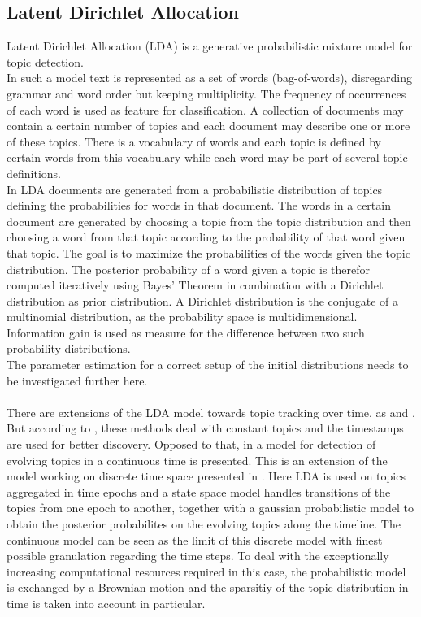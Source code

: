 \subsection{Latent Dirichlet Allocation}\label{sec:LDA}

Latent Dirichlet Allocation (LDA) \cite{Blei:2003:LDA:944919.944937}
 is a generative probabilistic mixture model for topic detection.
\\
In such a model text is represented as a set of words (bag-of-words), disregarding grammar and word order but keeping multiplicity. The frequency of occurrences of each word is used as feature for classification. A collection of documents may contain a certain number of topics and each document may describe one or more of these topics. There is a vocabulary of words and each topic is defined by certain words from this vocabulary while each word may be part of several topic definitions.
\\
In LDA documents are generated from a probabilistic distribution of topics defining the probabilities for words in that document. The words in a certain document are generated by choosing a topic from the topic distribution and then choosing a word from that topic according to the probability of that word given that topic. The goal is to maximize the probabilities of the words given the topic distribution.
The posterior probability of a word given a topic is therefor computed iteratively using Bayes' Theorem in combination with a Dirichlet distribution as prior distribution. A Dirichlet distribution is the conjugate of a multinomial distribution, as the probability space is multidimensional. Information gain is used as measure for the difference between two such probability distributions.
\\
The parameter estimation for a correct setup of the initial distributions needs to be investigated further here.
\\
\\
There are extensions of the LDA model towards topic tracking over time, as \cite{Wang:2006:TOT:1150402.1150450} and \cite{conf:ijcai:WeiSW07}. But according to \cite{conf:uai:WangBH08}, these methods deal with constant topics and the timestamps are used for better discovery. Opposed to that, in \cite{conf:uai:WangBH08} a model for detection of evolving topics in a continuous time is presented. This is an extension of the model working on discrete time space presented in \cite{Blei:2006:DTM:1143844.1143859}. Here LDA is used on topics aggregated in time epochs and a state space model handles transitions of the topics from one epoch to another, together with a gaussian probabilistic model to obtain the posterior probabilites on the evolving topics along the timeline. The continuous model can be seen as the limit of this discrete model with finest possible granulation regarding the time steps. To deal with the exceptionally increasing computational resources required in this case, the probabilistic model is exchanged by a Brownian motion and the sparsitiy of the topic distribution in time is taken into account in particular.


